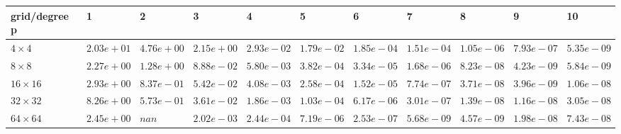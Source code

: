 \begin{tabular}{lllllllllll}
\hline
 grid/degree p   & 1          & 2          & 3          & 4          & 5          & 6          & 7          & 8          & 9          & 10         \\
\hline
 $4 \times 4$    & $2.03e+01$ & $4.76e+00$ & $2.15e+00$ & $2.93e-02$ & $1.79e-02$ & $1.85e-04$ & $1.51e-04$ & $1.05e-06$ & $7.93e-07$ & $5.35e-09$ \\
 $8 \times 8$    & $2.27e+00$ & $1.28e+00$ & $8.88e-02$ & $5.80e-03$ & $3.82e-04$ & $3.34e-05$ & $1.68e-06$ & $8.23e-08$ & $4.23e-09$ & $5.84e-09$ \\
 $16 \times 16$  & $2.93e+00$ & $8.37e-01$ & $5.42e-02$ & $4.08e-03$ & $2.58e-04$ & $1.52e-05$ & $7.74e-07$ & $3.71e-08$ & $3.96e-09$ & $1.06e-08$ \\
 $32 \times 32$  & $8.26e+00$ & $5.73e-01$ & $3.61e-02$ & $1.86e-03$ & $1.03e-04$ & $6.17e-06$ & $3.01e-07$ & $1.39e-08$ & $1.16e-08$ & $3.05e-08$ \\
 $64 \times 64$  & $2.45e+00$ & $nan$      & $2.02e-03$ & $2.44e-04$ & $7.19e-06$ & $2.53e-07$ & $5.68e-09$ & $4.57e-09$ & $1.98e-08$ & $7.43e-08$ \\
\hline
\end{tabular}